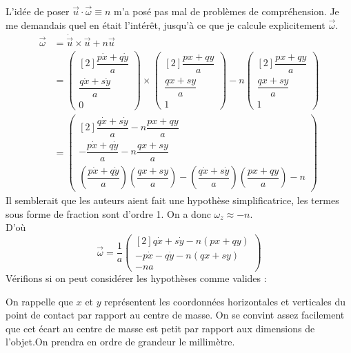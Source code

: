 \documentclass[12pt,a4paper]{article}
\begin{document}
	L'idée de poser $\vec{u}\cdot\vec{\omega}\equiv n$ m'a posé pas mal de problèmes de compréhension. Je me demandais quel en était l'intérêt, jusqu'à ce que je calcule explicitement $\vec{\omega}$.\\
	\bgroup
	\addtolength{\jot}{5pt}
	\begin{align*}
	\vec{\omega} &= \dot{\vec{u}}\times\vec{u}+n\vec{u}\\
	&=\begin{pmatrix}[2]\dfrac{p\dot{x}+q\dot{y}}{a}\\\dfrac{q\dot{x}+s\dot{y}}{a}\\0\end{pmatrix} \times \begin{pmatrix}[2]\dfrac{px+qy}{a}\\\dfrac{qx+sy}{a}\\1\end{pmatrix} -n\begin{pmatrix}[2]\dfrac{px+qy}{a}\\\dfrac{qx+sy}{a}\\1\end{pmatrix}\\
	&=\begin{pmatrix}[2]
	\dfrac{q\dot{x}+s\dot{y}}{a}-n\dfrac{px+qy}{a}\\
	-\dfrac{p\dot{x}+q\dot{y}}{a}-n\dfrac{qx+sy}{a}\\
	\left(\dfrac{p\dot{x}+q\dot{y}}{a}\right)  \left(\dfrac{qx+sy}{a}\right)  - \left(\dfrac{q\dot{x}+s\dot{y}}{a}\right)  \left( \dfrac{px+qy}{a}\right)  - n
	\end{pmatrix}
	\end{align*}
	Il semblerait que les auteurs aient fait une hypothèse simplificatrice, les termes sous forme de fraction sont d'ordre 1. On a donc $\omega_z\approx-n$.\\
	D'où
	\begin{equation}
	\vec{\omega}=\dfrac{1}{a}\begin{pmatrix}[2]
	q\dot{x}+s\dot{y}-n(px+qy)\\
	-p\dot{x}-q\dot{y}-n(qx+sy)\\
	- na
	\end{pmatrix}
	\end{equation}
	\egroup
	Vérifions si on peut considérer les hypothèses comme valides :
	
	
	On rappelle que $x$ et $y$ représentent les coordonnées horizontales et verticales du point de contact par rapport au centre de masse. On se convint assez facilement que cet écart au centre de masse est petit par rapport aux dimensions de l'objet.On prendra en ordre de grandeur le millimètre.
	
\end{document}
